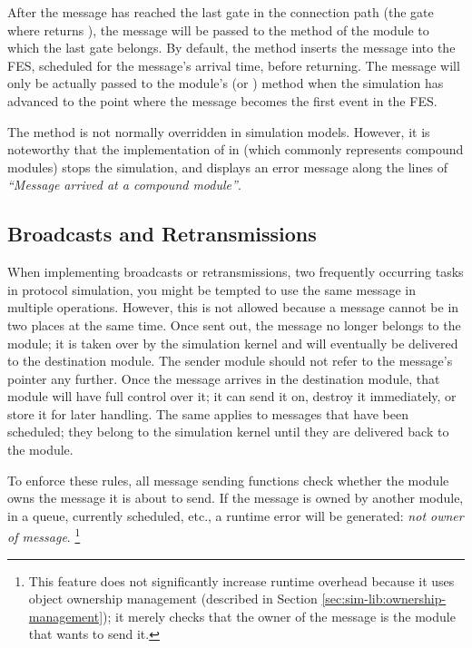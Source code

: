 After the message has reached the last gate in the connection path (the gate
where  returns ), the message will be passed
to the  method of the module to which the last gate belongs.
By default, the  method inserts the message into the FES,
scheduled for the message's arrival time, before returning. The message will
only be actually passed to the module's  (or )
method when the simulation has advanced to the point where the message becomes
the first event in the FES.

The  method is not normally overridden in simulation models.
However, it is noteworthy that the implementation of  in
 (which commonly represents compound modules) stops the
simulation, and displays an error message along the lines of \textit{``Message
arrived at a compound module''}.

\subsection{Broadcasts and Retransmissions}
\label{sec:simple-modules:broadcasts-and-retransmissions}

When implementing broadcasts or retransmissions, two frequently
occurring tasks in protocol simulation, you might be tempted
to use the same message in multiple  operations.
However, this is not allowed because a message cannot be in two places
at the same time. Once sent out, the message no longer belongs
to the module; it is taken over by the simulation kernel and will
eventually be delivered to the destination module. The sender module should
not refer to the message's pointer any further. Once the message arrives in the
destination module, that module will have full control over it; it can
send it on, destroy it immediately, or store it for later handling. The
same applies to messages that have been scheduled; they belong to the
simulation kernel until they are delivered back to the module.

To enforce these rules, all message sending functions check whether
the module owns the message it is about to send. If the message is owned by
another module, in a queue, currently scheduled, etc., a runtime error
will be generated: \textit{not owner of message}.
  \footnote{This feature does not significantly increase runtime overhead because
  it uses object ownership management (described in
  Section \ref{sec:sim-lib:ownership-management});
  it merely checks that the owner of the message is the module
  that wants to send it.}

